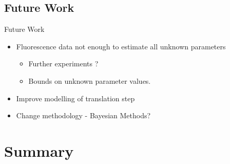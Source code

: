 \documentclass{beamer}
\begin{document}
\subsection{Future Work}


\begin{frame}{Future Work}

  \begin{itemize}
  \item Fluorescence data \alert {not enough} to estimate all unknown parameters 
  \begin{itemize}
  \item Further experiments ?
  \item Bounds on unknown parameter values.
  \end{itemize} 
  \item Improve modelling of translation step
  \item Change methodology - Bayesian Methods?

  \end{itemize}
  
  \end{frame}
  
  \section*{Summary}
\end{document}
